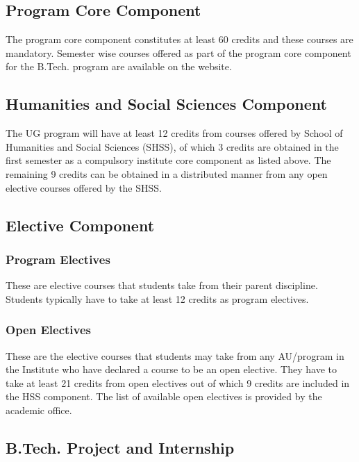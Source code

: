 \subsection{Program Core Component}

The program core component constitutes at least 60 credits and these courses are mandatory. Semester wise courses offered as part of the program core component for the B.Tech. program are available on the website.

\subsection{Humanities and Social Sciences Component}

The UG program will have at least 12 credits from courses offered by School of Humanities and Social Sciences (SHSS), of which 3 credits are obtained in the first semester as a compulsory institute core component as listed above. The remaining 9 credits can be obtained in a distributed manner from any open elective courses offered by the SHSS. 

\subsection{Elective Component}

\subsubsection{Program Electives}

These are elective courses that students take from their parent discipline. Students typically have to take at least 12 credits as program electives.

\subsubsection{Open Electives}

These are the elective courses that students may take from any AU/program in the Institute who have declared a course to be an open elective. They have to take at least 21 credits from open electives out of which 9 credits are included in the HSS component. The list of available open electives is provided by the academic office.

\subsection{B.Tech. Project and Internship}

